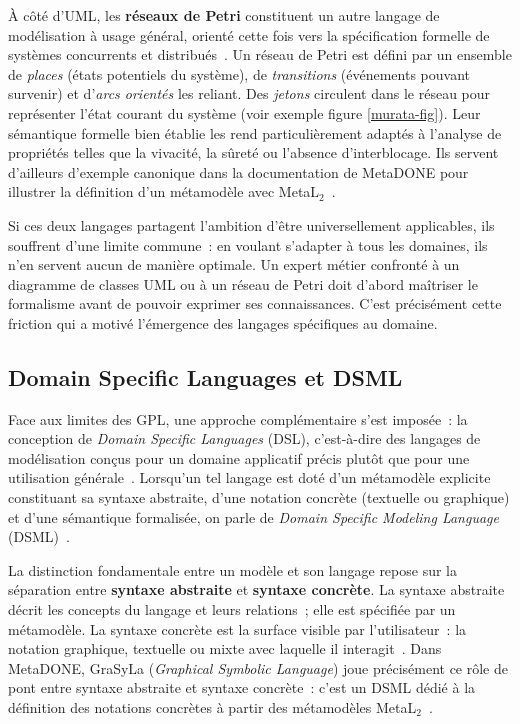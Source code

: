 À côté d'UML, les \textbf{réseaux de Petri} constituent un autre langage de modélisation à usage général, orienté cette fois vers la spécification formelle de systèmes concurrents et distribués~\cite{reisig1985petri,murata1989petri}. Un réseau de Petri est défini par un ensemble de \textit{places} (états potentiels du système), de \textit{transitions} (événements pouvant survenir) et d'\textit{arcs orientés} les reliant. Des \textit{jetons} circulent dans le réseau pour représenter l'état courant du système (voir exemple figure \ref{murata-fig}). Leur sémantique formelle bien établie les rend particulièrement adaptés à l'analyse de propriétés telles que la vivacité, la sûreté ou l'absence d'interblocage. Ils servent d'ailleurs d'exemple canonique dans la documentation de MetaDONE pour illustrer la définition d'un métamodèle avec MetaL$_2$~\cite{techreportgrasylaversion2}.

Si ces deux langages partagent l'ambition d'être universellement applicables, ils souffrent d'une limite commune~: en voulant s'adapter à tous les domaines, ils n'en servent aucun de manière optimale. Un expert métier confronté à un diagramme de classes UML ou à un réseau de Petri doit d'abord maîtriser le formalisme avant de pouvoir exprimer ses connaissances. C'est précisément cette friction qui a motivé l'émergence des langages spécifiques au domaine.

\subsection{Domain Specific Languages et DSML}
\label{sec:dsl-dsml}

Face aux limites des GPL, une approche complémentaire s'est imposée~: la conception de \textit{Domain Specific Languages} (DSL), c'est-à-dire des langages de modélisation conçus pour un domaine applicatif précis plutôt que pour une utilisation générale~\cite{schmidt2006model}. Lorsqu'un tel langage est doté d'un métamodèle explicite constituant sa syntaxe abstraite, d'une notation concrète (textuelle ou graphique) et d'une sémantique formalisée, on parle de \textit{Domain Specific Modeling Language} (DSML)~\cite{koshima2016distributed}.

La distinction fondamentale entre un modèle et son langage repose sur la séparation entre \textbf{syntaxe abstraite} et \textbf{syntaxe concrète}. La syntaxe abstraite décrit les concepts du langage et leurs relations~; elle est spécifiée par un métamodèle. La syntaxe concrète est la surface visible par l'utilisateur~: la notation graphique, textuelle ou mixte avec laquelle il interagit~\cite{koshima2016distributed}. Dans MetaDONE, GraSyLa (\textit{Graphical Symbolic Language}) joue précisément ce rôle de pont entre syntaxe abstraite et syntaxe concrète~: c'est un DSML dédié à la définition des notations concrètes à partir des métamodèles MetaL$_2$~\cite{techreportgrasylaversion2}.

